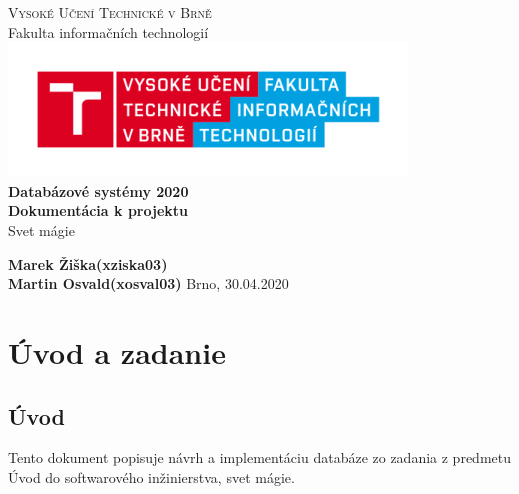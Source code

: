 \documentclass{article}
\begin{document}

	\begin{titlepage}
		\begin{center}
			\textsc{\Huge Vysoké Učení Technické v Brně} \\[0.7cm]
			{\Huge Fakulta informačních technologií}
			\center\includegraphics[width=0.5\linewidth]{./logo.png}\\[5cm]

            \textbf{{\Huge Databázové systémy 2020}}\\[0.5cm]

			\textbf{{\huge Dokumentácia k projektu}}\\[0.4cm]
			\LARGE{Svet mágie}\\
			
		\end{center}
		\vfill

		\begin{flushleft}
			\begin{Large}
				\textbf{Marek Žiška}\hspace{44px}\textbf{(xziska03)}\\[0.25cm]
				\textbf{Martin Osvald}\hspace{30px}\textbf{(xosval03)}
			\hfill
			Brno, 30.04.2020
			\end{Large}
		\end{flushleft}

	\end{titlepage}
    \tableofcontents
    \newpage
    \section{Úvod a zadanie}
    \subsection{Úvod}
    \Large{Tento dokument popisuje návrh a implementáciu databáze zo zadania z predmetu Úvod do softwarového inžinierstva, svet mágie.}
\end{document}
